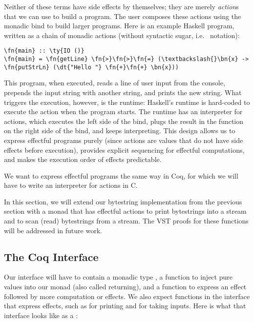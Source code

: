 Neither of these terms have side effects by themselves; they are merely \emph{action}s that we can use to build a program. The user composes these actions using the monadic bind to build larger programs. Here is an example Haskell program, written as a chain of monadic actions (without syntactic sugar, i.e.\  notation):

\begin{Verbatim}
\fn{main} :: \ty{IO ()}
\fn{main} = \fn{getLine} \fn{>}\fn{>}\fn{=} (\textbackslash{}\bn{x} -> \fn{putStrLn} (\dt{"Hello "} \fn{+}\fn{+} \bn{x}))
\end{Verbatim}

This program, when executed, reads a line of user input from the console, prepends the input string with another string, and prints the new string. What triggers the execution, however, is the runtime: Haskell's runtime is hard-coded to execute the  action when the program starts. The runtime has an interpreter for actions, which executes the left side of the bind, plugs the result in the function on the right side of the bind, and keeps interpreting. This design allows us to express effectful programs purely (since actions are values that do not have side effects before execution), provides explicit sequencing for effectful computations, and makes the execution order of effects predictable.

We want to express effectful programs the same way in Coq, for which we will have to write an interpreter for actions in C.

In this section, we will extend our  bytestring implementation from the previous section with a monad that has effectful actions to print bytestrings into a stream and to scan (read) bytestrings from a stream. The VST proofs for these functions will be addressed in future work.

\subsection{The Coq Interface}

Our interface will have to contain a monadic type , a function  to inject pure values into our monad (also called returning), and a function  to express an effect followed by more computation or effects. We also expect functions in the interface that express effects, such as  for printing and  for taking inputs. Here is what that interface looks like as a :

